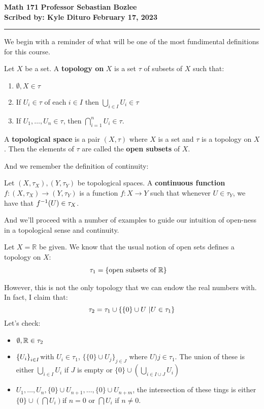 \documentclass[12pt, twosided]{article}
\begin{document}
\noindent \textbf{Math 171} \hfill \textbf{Professor Sebastian Bozlee} \\
\textbf{Scribed by: Kyle Dituro} \hfill \textbf{February 17, 2023}\hrule
\vspace{.2in}
We begin with a reminder of what will be one of the most fundimental definitions for this course.

\begin{df}
  Let \(X\) be a set. A \textbf{topology on} \(X\) is a set \(\tau\) of subsets 
of \(X\) such that:
\begin{enumerate}
  \item \(\emptyset, X \in \tau\)
  \item If \(U_i \in \tau\) of each \(i \in I\) then \(\bigcup_{i \in I} U_i \in \tau\)
  \item If \(U_1, \ldots, U_n \in \tau\), then \(\bigcap_{i = 1}^n U_i \in \tau\).
  \end{enumerate}
    A \textbf{topological space} is a pair \((X, \tau)\) where \(X\) is a set and \(\tau\) is a topology on \(X\). Then the elements of \(\tau\) are called the \textbf{open subsets} of \(X\).

\end{df}

And we remember the definition of continuity:

\begin{df}
  Let \((X, \tau_X), (Y, \tau_Y)\) be topological spaces. A \textbf{continuous function} \(f: (X, \tau_X) \to (Y, \tau_Y)\) is a function \(f: X \to Y\) such that whenever \(U \in \tau_Y\), we have that \(f^{-1}(U) \in \tau_X\).
\end{df}

And we'll proceed with a number of examples to guide our intuition of open-ness in a topological sense and continuity.

\begin{exa}
  Let \(X = \mathbb{R}\) be given. We know that the usual notion of open sets defines a topology on \(X\):
  \begin{align*}
    \tau_1 &= \left\{ \text{open subsets of } \mathbb{R} \right\}
  \end{align*}

  However, this is not the only topology that we can endow the real numbers with. In fact, I claim that: \[\tau_2 = \tau_1 \cup \left\{ \left\{ 0 \right\} \cup U\ \middle\vert U \in \tau_1 \right\}\]
  Let's check:
  \begin{itemize}
  \item \(\emptyset, \mathbb{R} \in \tau_2\)
  \item \(\left\{ U_i \right\}_{i \in I}\)with \(U_i \in \tau_1\), \(\{\{0\} \cup U_j\}_{j \in J}\) where \(U)j \in \tau_1\). The union of these is either \(\bigcup_{i \in I}U_i\) if \(J\) is empty or \(\{0\} \cup \left( \bigcup_{i \in I \cup J} U_i \right)\)
  \item \(U_1, \ldots, U_n, \{0\} \cup U_{n+1}, \ldots, \{0\} \cup U_{n + m}\), the intersection of these tings is either \(\{0\} \cup \left( \bigcap U_i\right)\)if \(n = 0\) or \(\bigcap U_i\) if \(n \neq 0\).
  \end{itemize}
      
\end{exa}
\end{document}
